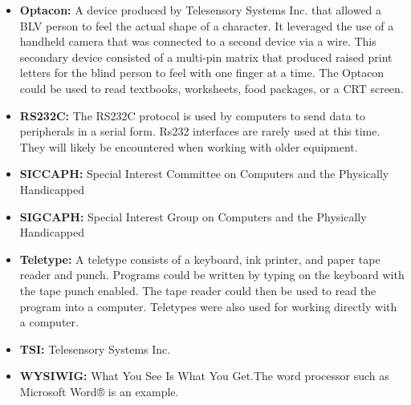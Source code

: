 \documentclass[11.5pt]{sig-alternate}
\begin{document}
\begin{large}
\begin{itemize}
    \item \textbf{Optacon:} A device produced by Telesensory Systems Inc. that allowed a BLV person to feel the actual shape of a character. It leveraged the use of a handheld camera that was connected to a second device via a wire. This secondary device consisted of a multi-pin matrix that produced raised print letters for the blind person to feel with one finger at a time. The Optacon could be used to read textbooks, worksheets, food packages, or a CRT screen.
    \item \textbf{RS232C:} The RS232C protocol is used by computers to send data to peripherals in a serial form. Rs232 interfaces are rarely used at this time. They will likely be encountered when working with older equipment.
    \item \textbf{SICCAPH:} Special Interest Committee on Computers and the Physically Handicapped
    \item \textbf{SIGCAPH:} Special Interest Group on Computers and the Physically Handicapped
    \item \textbf{Teletype:} A teletype consists of a keyboard, ink printer, and paper tape reader and punch. Programs could be written by typing on the keyboard with the tape punch enabled. The tape reader could then be used to read the program into a computer. Teletypes were also used for working directly with a computer.
    \item \textbf{TSI:} Telesensory Systems Inc.
    \item \textbf{WYSIWIG:} What You See Is What You Get.The word processor such as Microsoft Word® is an example.
\end{itemize}
 
\end{large}
\end{document}
